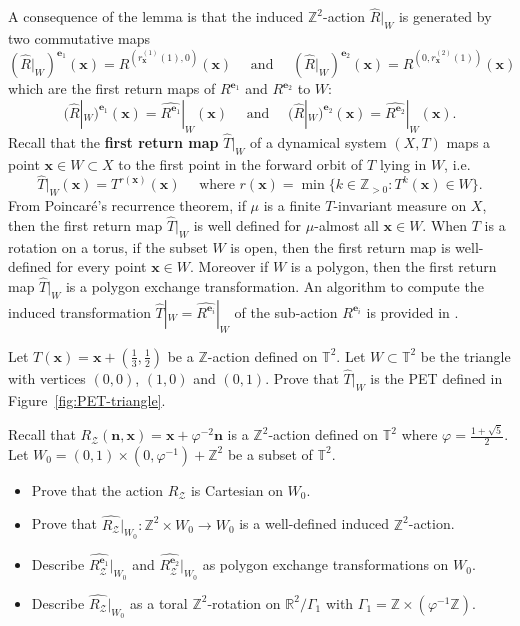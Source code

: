 \documentclass[12pt]{amsart}
\newcommand{\Z}{\mathbb{Z}}
\newcommand{\R}{\mathbb{R}}
\newcommand{\be}{{\boldsymbol{e}}}
\newcommand{\bn}{{\boldsymbol{n}}}
\newcommand{\bx}{{\boldsymbol{x}}}
\newcommand{\Zcal}{\mathcal{Z}}
\newcommand{\torus}{\mathbb{T}}
\newcommand{\ifnv}[2]{\ifthenelse{\equal{#1}{}}{}{#2}}
\newcommand\defn[2][]{\ifnv{#1}{\index{#1|\textbf}}{\index{#2|\textbf}}\textbf{#2}}
\begin{document}
A consequence of the lemma is that
the induced $\Z^2$-action $\widehat{R}|_W$
is generated by two commutative maps
\[
    (\widehat{R}|_W)^{\be_1}(\bx)
    = R^{(r_\bx^{(1)}(1),0)}(\bx)
    \quad\text{ and }\quad
    (\widehat{R}|_W)^{\be_2}(\bx)
    = R^{(0,r_\bx^{(2)}(1))}(\bx)
\]
which are the first return maps of $R^{\be_1}$ and $R^{\be_2}$
to $W$:
\[
    (\widehat{R}|_W)^{\be_1}(\bx)
    = \widehat{R^{\be_1}}|_W(\bx)
    \quad\text{ and }\quad
    (\widehat{R}|_W)^{\be_2}(\bx)
    = \widehat{R^{\be_2}}|_W(\bx).
\]
Recall that the \defn{first return map}
$\widehat{T}|_W$ of a dynamical system $(X,T)$ maps a point $\bx\in W\subset X$
to the first point in the forward orbit of
$T$ lying in $W$, i.e.
\[
    \widehat{T}|_W(\bx) = T^{r(\bx)}(\bx) \quad\text{ where }
    r(\bx) = \min\{k\in\Z_{>0} : T^k(\bx)\in W\}.
\]
From Poincar\'e's recurrence theorem,
if $\mu$ is a finite $T$-invariant measure on $X$, then
the first return map $\widehat{T}|_W$ is well
defined for $\mu$-almost all $\bx\in W$.
When $T$ is a rotation on a torus, if the subset $W$ is
open, then the first return map is well-defined for every point $\bx\in W$.
Moreover if $W$ is a polygon, then the first return map $\widehat{T}|_W$
is a polygon exchange transformation.
An algorithm to compute the induced transformation
$\widehat{T}|_W=\widehat{R^{\be_i}}|_W$ of the sub-action $R^{\be_i}$
is provided in \cite{MR4347332}.

\begin{exo}[label={exo:PET-on-triangle-nontrivial}]
    Let $T(\bx) = \bx+(\frac{1}{3},\frac{1}{2})$
    be a $\Z$-action defined on $\torus^2$.
    Let $W\subset\torus^2$ be the triangle with vertices $(0,0)$, $(1,0)$ and
    $(0,1)$. Prove that $\widehat{T}|_W$ is the PET defined
    in Figure~\ref{fig:PET-triangle}.
\end{exo}


\begin{exo}[label={exo:induction-z2-action}]
    Recall that $R_\Zcal(\bn,\bx) = \bx+\varphi^{-2}\bn$
    is a $\Z^2$-action defined on $\torus^2$ where
    $\varphi=\frac{1+\sqrt{5}}{2}$.
    Let $W_0=(0,1)\times(0,\varphi^{-1})+\Z^2$ be a subset of $\torus^2$.
    \begin{itemize}
        \item Prove that the action $R_\Zcal$ is Cartesian on $W_0$.
        \item Prove that $\widehat{R_\Zcal}|_{W_0}:\Z^2\times W_0\to W_0$ is a
            well-defined induced $\Z^2$-action.
        \item Describe $\widehat{R_\Zcal^{\be_1}}|_{W_0}$ and 
                       $\widehat{R_\Zcal^{\be_2}}|_{W_0}$
                       as polygon exchange transformations on $W_0$.
        \item Describe $\widehat{R_\Zcal}|_{W_0}$ as a toral $\Z^2$-rotation on
            $\R^2/\Gamma_1$ with $\Gamma_1=\Z\times(\varphi^{-1}\Z)$.
    \end{itemize}
\end{exo}
\end{document}
